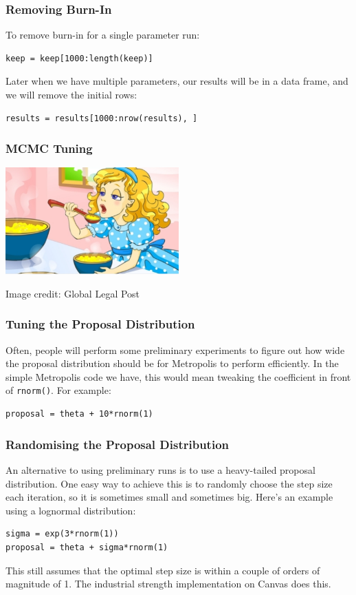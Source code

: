 \documentclass{beamer}
\begin{document}
\begin{frame}[fragile]
\frametitle{Removing Burn-In}
To remove burn-in for a single parameter run:
\begin{verbatim}
keep = keep[1000:length(keep)]
\end{verbatim}

Later when we have multiple parameters, our results will be in a data frame,
and we will remove the initial rows:
\begin{verbatim}
results = results[1000:nrow(results), ]
\end{verbatim}

\end{frame}




\begin{frame}
\frametitle{MCMC Tuning}

\centering
\includegraphics[width=0.5\textwidth]{images/goldilocks.png}

Image credit: Global Legal Post

\end{frame}



\begin{frame}[fragile]
\frametitle{Tuning the Proposal Distribution}
Often, people will perform some preliminary experiments to figure out how
wide the proposal distribution should be for Metropolis to perform efficiently.
In the simple Metropolis code we have, this would mean tweaking the
coefficient in front of \texttt{rnorm()}. For example:

\begin{verbatim}
proposal = theta + 10*rnorm(1)
\end{verbatim}

\end{frame}



\begin{frame}[fragile]
\frametitle{Randomising the Proposal Distribution}
An alternative to using preliminary runs is to use a heavy-tailed proposal
distribution. One easy way to achieve this is to randomly choose the step
size each iteration, so it is sometimes small and sometimes big.
Here's an example using a lognormal distribution:

\begin{verbatim}
sigma = exp(3*rnorm(1))
proposal = theta + sigma*rnorm(1)
\end{verbatim}

\pause

This still assumes that the optimal step size is within a couple of orders
of magnitude of 1. The industrial strength implementation on Canvas does this.

\end{frame}
\end{document}
